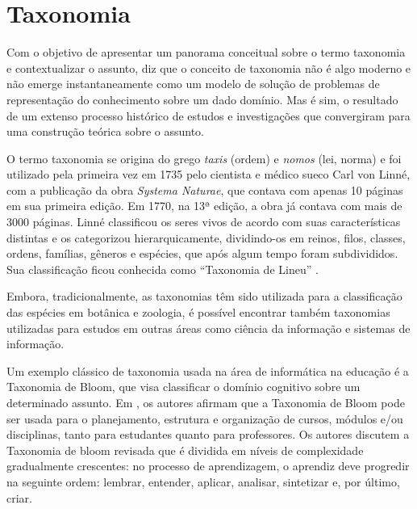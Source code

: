 
\section{Taxonomia}
\label{sec:taxonomia}
Com o objetivo de apresentar um panorama conceitual sobre o termo taxonomia e contextualizar o assunto,  diz que o conceito de taxonomia
não é algo moderno e não emerge instantaneamente como um modelo de solução de problemas de representação do conhecimento sobre um dado domínio. Mas é sim,
o resultado de um extenso processo histórico de estudos e investigações que convergiram para uma construção teórica sobre o assunto. 

\par
O termo taxonomia se origina do grego \textit{taxis} (ordem) e \textit{nomos} (lei, norma) e foi utilizado pela primeira vez em 1735 pelo cientista e médico sueco Carl von Linné,
com a publicação da obra \textit{Systema Naturae}, que contava com apenas 10 páginas em sua primeira edição. Em 1770, na 13ª edição, a obra já contava com mais de 3000 páginas.
Linné classificou os seres vivos de acordo com suas características distintas e os categorizou hierarquicamente, dividindo-os em reinos, filos, classes, ordens, famílias, 
gêneros e espécies, que após algum tempo foram subdivididos. Sua classificação ficou conhecida como “Taxonomia de Lineu” \cite{polaszek2010systema}.

\par
Embora, tradicionalmente, as taxonomias têm sido utilizada para a classificação das espécies em botânica e zoologia, é possível encontrar também taxonomias utilizadas para estudos em outras áreas como ciência da informação e sistemas de informação.
\par
Um exemplo clássico de taxonomia usada na área de informática na educação é a Taxonomia de Bloom, que visa classificar o domínio cognitivo sobre um determinado assunto. 
Em , os autores afirmam que a Taxonomia de Bloom pode ser usada para o planejamento, estrutura e organização de cursos, módulos e/ou disciplinas, tanto para estudantes quanto para professores. Os autores discutem a Taxonomia de bloom revisada que é dividida em níveis de complexidade gradualmente crescentes: no  processo de aprendizagem, o aprendiz deve progredir na seguinte ordem: lembrar, entender, aplicar, analisar, sintetizar e, por último, criar. 
\par

